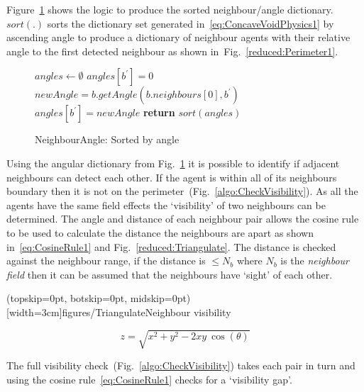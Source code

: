 \documentclass{ieeeaccess}
\begin{document}
Figure~\ref{algo:getNeighbourAngles} shows the logic to produce the sorted neighbour/angle dictionary. $sort(.)$ sorts the dictionary set generated in~\ref{eq:ConcaveVoidPhysics1} by ascending angle to produce a dictionary of neighbour agents with their relative angle to the first detected neighbour as shown in~Fig.~\ref{reduced:Perimeter1}.

\begin{figure}
\begin{algorithmic}[1]
{}
\State $angles \leftarrow \emptyset$
  \State $angles[b^{'}] = 0$
\Else
\State $newAngle = b.getAngle(b.neighbours[0], b^{'})$
   \State $angles[b^{'}] = newAngle$
\EndIf
\EndFor
\State\textbf{return} $sort(angles)$ 
\EndProcedure
\end{algorithmic}
\caption{NeighbourAngle: Sorted by angle}
\label{algo:getNeighbourAngles}
\end{figure}

Using the angular dictionary from Fig.~\ref{algo:getNeighbourAngles} it is possible to identify if adjacent neighbours can detect each other. If the agent is within all of its neighbours boundary then it is not on the perimeter~(Fig.~\ref{algo:CheckVisibility}). 
As all the agents have the same field effects the `visibility' of two neighbours can be determined. The angle and distance of each neighbour pair allows the cosine rule to be used to calculate the distance the neighbours are apart as shown in~\ref{eq:CosineRule1} and Fig.~\ref{reduced:Triangulate}. The distance is checked against the neighbour range, if the distance is $\leq N_b$ where $N_b$ is the \textit{neighbour field} then it can be assumed that the neighbours have `sight' of each other. 

\Figure[t!](topskip=0pt, botskip=0pt, midskip=0pt)[width=3cm]{figures/Triangulate}{Neighbour visibility\label{reduced:Triangulate}}

\begin{equation}
\label{eq:CosineRule1}
z = \sqrt{x^2 + y^2 - 2xy~\cos(\theta)}
\end{equation}

The full visibility check~(Fig.~\ref{algo:CheckVisibility}) takes each pair in turn and using the cosine rule~\ref{eq:CosineRule1} checks for a `visibility gap'. 
\end{document}
